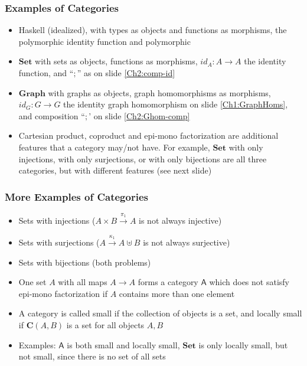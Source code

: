 \documentclass[handout]{beamer}
\newcommand{\bfsf}[1]{{\boldsymbol{#1}}}
\newcommand{\Set}{\bfsf{Set}}
\newcommand{\Gra}{\bfsf{Graph}}
\newcommand{\CC}{\bfsf{C}}
\begin{document}
\frame
  {   
    \frametitle{Examples of Categories}\label{Ch2:ExaCat}

 \begin{itemize}[<+->]
\item Haskell (idealized), with types as objects and functions as morphisms, 
the polymorphic identity function and polymorphic 
\item $\Set$ with sets as objects, functions as morphisms,
$id_A: A\to A$ the identity function, and ``$;$'' as on slide \ref{Ch2:comp-id}
\item $\Gra$ with graphs as objects, graph homomorphisms as morphisms,
$id_G: G\to G$ the identity graph homomorphism on slide \ref{Ch1:GraphHoms}, 
and composition ``$;$' on slide \ref{Ch2:Ghom-comp}
\item Cartesian product, coproduct and epi-mono factorization are additional
features that a category may/not have. For example, $\Set$ with only injections,
with only surjections, or with only bijections are all three categories, but
with different features (see next slide)
 \end{itemize}

 }

\frame
  {   
    \frametitle{More Examples of Categories}\label{Ch2:MoreExaCat}

 \begin{itemize}[<+->]
\item Sets with injections ($A\times B \stackrel{\pi_1}{\to} A$ is not always injective)
\item Sets with surjections ($ A\stackrel{\kappa_1}{\to} A\uplus B$ is not always surjective)
\item Sets with bijections (both problems)
\item One set $A$ with all maps $A\to A$ forms a category $\mathsf{A}$
which does not satisfy epi-mono factorization if $A$ contains more than one element
\item A category is called small if the collection of objects is a set, and locally small
if $\CC(A,B)$ is a set for all objects $A,B$
\item Examples: $\mathsf{A}$ is both small and locally small, $\Set$ is only locally small,
but not small, since there is no set of all sets
 \end{itemize}
 }
\end{document}
